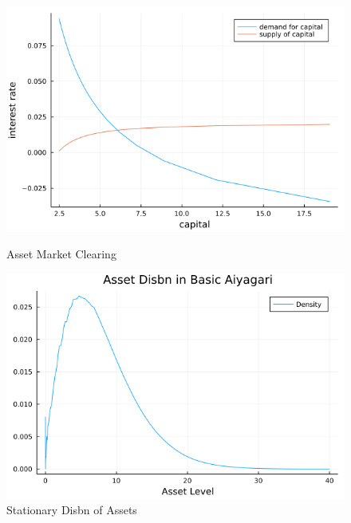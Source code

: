 \documentclass[12pt]{article}
\begin{document}
\begin{figure}[h]
    \centering
    \begin{minipage}{0.45\textwidth}
        \centering
        \includegraphics[width=1\textwidth]{basic_aiya_r.png} %
        \caption{Asset Market Clearing}
    \end{minipage}\hfill
    \begin{minipage}{0.45\textwidth}
        \centering
        \includegraphics[width=1\textwidth]{basic_aiya_A_dis.png} %
        \caption{Stationary Disbn of Assets}
    \end{minipage}
\end{figure}

\end{document}
